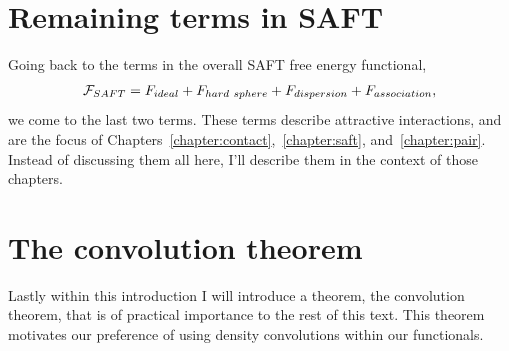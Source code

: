 \clearpage
\newpage

\section{Remaining terms in SAFT}

Going back to the terms in the overall SAFT free energy functional,
\begin{align}
  \mathcal{F}_{SAFT} = F_{ideal} + F_{hard~sphere} +  F_{dispersion} + F_{association},
\end{align}
we come to the last two terms.  These terms describe attractive
interactions, and are the focus of
Chapters~\ref{chapter:contact},~\ref{chapter:saft},
and~\ref{chapter:pair}.  Instead of discussing them all here, I'll
describe them in the context of those chapters.



\clearpage
\newpage

\section{The convolution theorem}

Lastly within this introduction I will introduce a theorem, the
convolution theorem, that is of practical importance to the rest of
this text.  This theorem motivates our preference of using density
convolutions within our functionals.

